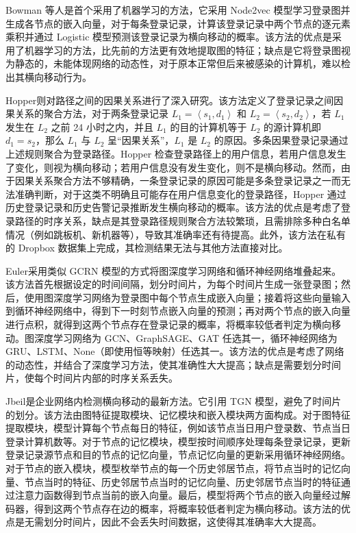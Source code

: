 {Bowman 等人\citep{bowman2020detecting}是首个采用了机器学习的方法，它采用 Node2vec 模型学习登录图并生成各节点的嵌入向量，对于每条登录记录，计算该登录记录中两个节点的逐元素乘积并通过 Logistic 模型预测该登录记录为横向移动的概率。该方法的优点是采用了机器学习的方法，比先前的方法更有效地提取图的特征；缺点是它将登录图视为静态的，未能体现网络的动态性，对于原本正常但后来被感染的计算机，难以检出其横向移动行为。

Hopper\citep{ho2021hopper}则对路径之间的因果关系进行了深入研究。该方法定义了登录记录之间因果关系的聚合方法，对于两条登录记录 $L_1=\left<s_1, d_1\right>$ 和 $L_2=\left<s_2, d_2\right>$，若 $L_1$ 发生在 $L_2$ 之前 24 小时之内，并且 $L_1$ 的目的计算机等于 $L_2$ 的源计算机即 $d_1=s_2$，那么 $L_1$ 与 $L_2$ 呈``因果关系''，$L_1$ 是 $L_2$ 的原因。多条因果登录记录通过上述规则聚合为登录路径。Hopper 检查登录路径上的用户信息，若用户信息发生了变化，则视为横向移动；若用户信息没有发生变化，则不是横向移动。然而，由于因果关系聚合方法不够精确，一条登录记录的原因可能是多条登录记录之一而无法准确判断，对于这类不明确且可能存在用户信息变化的登录路径，Hopper 通过历史登录记录和历史告警记录推断发生横向移动的概率。该方法的优点是考虑了登录路径的时序关系，缺点是其登录路径规则聚合方法较繁琐，且需排除多种白名单情况（例如跳板机、新机器等），导致其准确率还有待提高。此外，该方法在私有的 Dropbox 数据集上完成，其检测结果无法与其他方法直接对比。

Euler\citep{king2023euler}采用类似 GCRN\citep{seo2018gcrn} 模型的方式将图深度学习网络和循环神经网络堆叠起来。该方法首先根据设定的时间间隔，划分时间片，为每个时间片生成一张登录图；然后，使用图深度学习网络为登录图中每个节点生成嵌入向量；接着将这些向量输入到循环神经网络中，得到下一时刻节点嵌入向量的预测；再对两个节点的嵌入向量进行点积，就得到这两个节点存在登录记录的概率，将概率较低者判定为横向移动。图深度学习网络为 GCN、GraphSAGE\citep{hamilton2017inductive}、GAT\citep{velivckovic2017graph} 任选其一，循环神经网络为 GRU、LSTM\citep{hochreiter1997long}、None（即使用恒等映射）任选其一。该方法的优点是考虑了网络的动态性，并结合了深度学习方法，使其准确性大大提高；缺点是需要划分时间片，使每个时间片内部的时序关系丢失。

Jbeil\citep{khoury2023jbeil}是企业网络内检测横向移动的最新方法。它引用 TGN 模型，避免了时间片的划分。该方法由图特征提取模块、记忆模块和嵌入模块两方面构成。对于图特征提取模块，模型计算每个节点每日的特征，例如该节点当日用户登录数、节点当日登录计算机数等。对于节点的记忆模块，模型按时间顺序处理每条登录记录，更新登录记录源节点和目的节点的记忆向量，节点记忆向量的更新采用循环神经网络。对于节点的嵌入模块，模型枚举节点的每一个历史邻居节点，将节点当时的记忆向量、节点当时的特征、历史邻居节点当时的记忆向量、历史邻居节点当时的特征通过注意力函数得到节点当前的嵌入向量。最后，模型将两个节点的嵌入向量经过解码器，得到这两个节点存在边的概率，将概率较低者判定为横向移动。该方法的优点是无需划分时间片，因此不会丢失时间数据，这使得其准确率大大提高。

}
